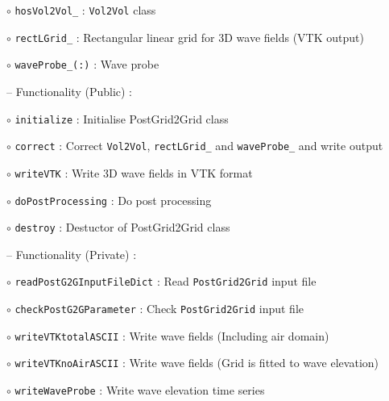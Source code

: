 	\hspace{1.0 cm} $\circ$ \texttt{hosVol2Vol\_} : \texttt{Vol2Vol} class
	
	\hspace{1.0 cm} $\circ$ \texttt{rectLGrid\_} : Rectangular linear grid for 3D wave fields (VTK output)
	
	\hspace{1.0 cm} $\circ$ \texttt{waveProbe\_(:)} : Wave probe 
	
	\vspace{0.5cm}
	
	\hspace{0.5 cm} -- Functionality (Public) :
	
	\hspace{1.0 cm} $\circ$ \texttt{initialize} : Initialise PostGrid2Grid class
	
	\hspace{1.0 cm} $\circ$ \texttt{correct} : Correct \texttt{Vol2Vol}, \texttt{rectLGrid\_} and \texttt{waveProbe\_} and write output
	
	\hspace{1.0 cm} $\circ$ \texttt{writeVTK} : Write 3D wave fields in VTK format
	
	\hspace{1.0 cm} $\circ$ \texttt{doPostProcessing} : Do post processing 
	
	\hspace{1.0 cm} $\circ$ \texttt{destroy} : Destuctor of PostGrid2Grid class
	
	\vspace{0.5cm}
	
	\hspace{0.5 cm} -- Functionality (Private) :
	
	\hspace{1.0 cm} $\circ$ \texttt{readPostG2GInputFileDict} : Read \texttt{PostGrid2Grid} input file
	
	\hspace{1.0 cm} $\circ$ \texttt{checkPostG2GParameter} : Check \texttt{PostGrid2Grid} input file
	
	\hspace{1.0 cm} $\circ$ \texttt{writeVTKtotalASCII} : Write wave fields (Including air domain)
	
	\hspace{1.0 cm} $\circ$ \texttt{writeVTKnoAirASCII} : Write wave fields (Grid is fitted to wave elevation)
	
	\hspace{1.0 cm} $\circ$ \texttt{writeWaveProbe} : Write wave elevation time series
	
